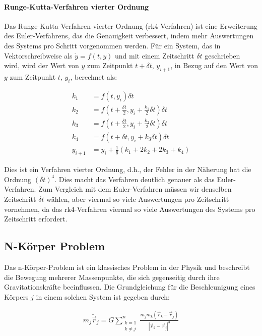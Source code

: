 \documentclass[a4paper,12pt,twoside]{article}
\begin{document}
\paragraph{Runge-Kutta-Verfahren vierter Ordnung}
Das Runge-Kutta-Verfahren vierter Ordnung (rk4-Verfahren) ist eine Erweiterung des Euler-Verfahrens, das die Genauigkeit verbessert, indem mehr Auswertungen des Systems pro Schritt vorgenommen werden. Für ein System, das in Vektorschreibweise als $\dot{y} = f(t, y)$ und mit einem Zeitschritt $\delta t$ geschrieben wird, wird der Wert von $y$ zum Zeitpunkt $t + \delta t$, $y_{i+1}$, in Bezug auf den Wert von $y$ zum Zeitpunkt $t$, $y_i$, berechnet als:

\begin{align*}
    k_1 &= f(t, y_i)\delta t \\
    k_2 &= f\left(t + \frac{\delta t}{2}, y_i + \frac{k_1}{2} \delta t \right) \delta t \\
    k_3 &= f\left(t + \frac{\delta t}{2}, y_i + \frac{k_2}{2} \delta t \right) \delta t \\
    k_4 &= f(t + \delta t, y_i + k_3 \delta t) \delta t \\
    y_{i+1} &= y_i + \frac{1}{6}(k_1 + 2k_2 + 2k_3 + k_4)
\end{align*}

Dies ist ein Verfahren vierter Ordnung, d.h., der Fehler in der Näherung hat die Ordnung $(\delta t)^4$. Dies macht das Verfahren deutlich genauer als das Euler-Verfahren. Zum Vergleich mit dem Euler-Verfahren müssen wir denselben Zeitschritt $\delta t$ wählen, aber viermal so viele Auswertungen pro Zeitschritt vornehmen, da das rk4-Verfahren viermal so viele Auswertungen des Systems pro Zeitschritt erfordert.




\subsection{N-Körper Problem}
Das n-Körper-Problem ist ein klassisches Problem in der Physik und beschreibt die Bewegung mehrerer Massenpunkte, die sich gegenseitig durch ihre Gravitationskräfte beeinflussen. Die Grundgleichung für die Beschleunigung eines Körpers \( j \) in einem solchen System ist gegeben durch:

\begin{align*}
	m_j \ddot{\vec{r}}_j = G \sum_{\substack{k=1 \\ k \neq j}}^n \frac{m_j m_k (\vec{r}_k - \vec{r}_j)}{|\vec{r}_k - \vec{r}_j|^3}
\end{align*}
\end{document}
